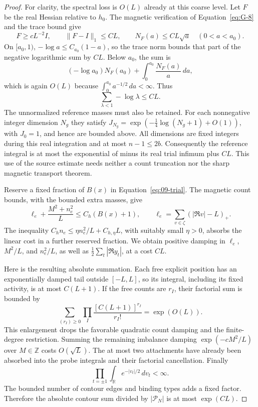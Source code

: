 \begin{proof}
For clarity, the spectral loss is $O(L)$ already at this coarse level.
Let $F$ be the real Hessian relative to $h_0$.  The magnetic verification
of Equation~\eqref{eq:G-8} and the trace bound give
\[
 F\ge cL^{-2}I,\qquad \|F-I\|_1\le CL,
 \qquad N_F(a)\le CL\sqrt a\quad(0<a<a_0).
\]
On $[a_0,1)$, $-\log a\le C_{a_0}(1-a)$, so the trace norm
bounds that part of the negative logarithmic sum by $CL$.  Below
$a_0$, the sum is
\[
 (-\log a_0)N_F(a_0)+\int_0^{a_0}\frac{N_F(a)}a\,da,
\]
which is again $O(L)$ because
$\int_0^{a_0}a^{-1/2}\,da<\infty$.  Thus
\[
                  \sum_{\lambda<1}-\log\lambda\le CL.
\]
The unnormalized reference masses must also be retained.  For each
nonnegative integer dimension $N_g$ they satisfy
$J_{N_g}=\exp(-\tfrac14\log(N_g+1)+O(1))$, with
$J_0=1$, and hence are bounded above.  All dimensions are fixed
integers during this real integration and at most $n-1\le 2b$.
Consequently the reference integral is at most the exponential of
minus its real trial infimum plus $CL$.  This use of the source
estimate needs neither a count truncation nor the sharp magnetic
transport theorem.

Reserve a fixed fraction of $B(x)$ in
Equation~\eqref{eq:09-trial}.  The magnetic count bounds, with the
bounded extra masses, give
\[
 \ell_e+\frac{M^2+n_e^2}{L}\le C_h(B(x)+1),
 \qquad
 \ell_e=\sum_{v\in\zeta}(|\Re v|-L)_+.
\]
The inequality
$C_hn_e\le \eta n_e^2/L+C_{h,\eta}L$, with suitably small
$\eta>0$, absorbs the linear cost in a further reserved fraction.
We obtain positive damping in $\ell_e$, $M^2/L$, and $n_e^2/L$,
as well as $\tfrac12\sum_t|\Re y_t|$, at a cost $CL$.

Here is the resulting absolute summation.  Each free explicit position
has an exponentially damped tail outside $[-L,L]$, so its integral,
including its fixed activity, is at most $C(L+1)$.  If the free counts
are $r_I$, their factorial sum is bounded by
\[
 \sum_{(r_I)\ge0}\prod_I\frac{[C(L+1)]^{r_I}}{r_I!}
                     =\exp(O(L)).
\]
This enlargement drops the favorable quadratic count damping and the
finite-degree restriction.  Summing the remaining imbalance damping
$\exp(-cM^2/L)$ over $M\in\mathbb Z$ costs $O(\sqrt L)$.
The at most two attachments have already been absorbed into the probe
integrals and their factorial cancellation.  Finally
\[
 \prod_{t=\pm1}\int_{\mathbb R}e^{-|v_t|/2}\,dv_t<\infty.
\]
The bounded number of contour edges and binding types adds a fixed
factor.  Therefore the absolute contour sum divided by
$|\mathcal P_N|$ is at most $\exp(CL)$.


\end{proof}
